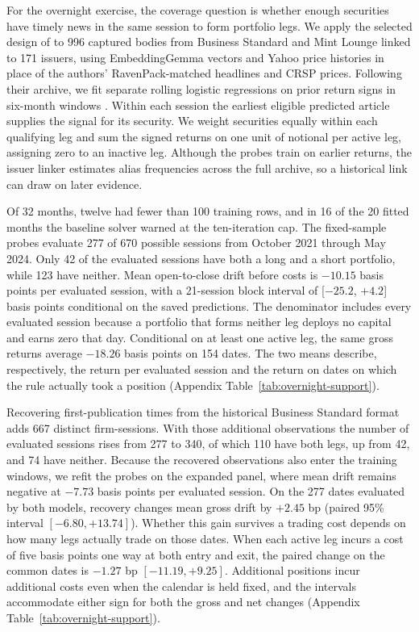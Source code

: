 For the overnight exercise, the coverage question is whether enough
securities have timely news in the same session to form portfolio legs.
We apply the selected design of \citet{lopez2025v6,lopez2026} to 996
captured bodies from Business Standard and Mint Lounge linked to 171
issuers, using EmbeddingGemma vectors and Yahoo price histories in place
of the authors' RavenPack-matched headlines and CRSP prices. Following
their archive, we fit separate rolling logistic regressions on prior
return signs in six-month windows \citep{lopez2026archive}. Within
each session the earliest eligible predicted article supplies
the signal for its security. We weight securities equally within each
qualifying leg and sum the signed returns on one unit of notional per
active leg, assigning zero to an inactive leg. Although the probes
train on earlier returns, the issuer linker estimates alias frequencies
across the full archive, so a historical link can draw on later evidence.

Of 32 months, twelve had fewer than 100 training rows, and in 16 of
the 20 fitted months the baseline solver warned at the ten-iteration
cap. The fixed-sample probes evaluate 277 of 670 possible sessions
from October 2021 through May 2024. Only 42 of the evaluated sessions
have both a long and a short portfolio, while 123 have neither. Mean
open-to-close drift before costs is $-10.15$ basis points per evaluated
session, with a 21-session block interval of [$-25.2$, $+4.2$] basis
points conditional on the saved predictions. The denominator includes
every evaluated session because a portfolio that forms neither leg
deploys no capital and earns zero that day. Conditional on at least
one active leg, the same gross returns average $-18.26$ basis points
on 154 dates. The two means describe, respectively, the return per
evaluated session and the return on dates on which the rule actually
took a position (Appendix Table~\ref{tab:overnight-support}).

Recovering first-publication times from the historical Business Standard
format adds 667 distinct firm-sessions. With those additional
observations the number of evaluated sessions
rises from 277 to 340, of which 110 have both legs, up from 42, and
74 have neither. Because the recovered observations also enter the
training windows, we refit the probes on the expanded panel, where mean
drift remains negative at $-7.73$ basis points per evaluated session.
On the
277 dates evaluated by both models, recovery changes mean gross drift
by $+2.45$ bp (paired 95\% interval $[-6.80,+13.74]$). Whether this
gain survives a trading cost depends on how many legs actually trade
on those dates. When each active leg incurs a cost of five basis points
one way at both entry and exit, the paired change on the common dates is
$-1.27$ bp $[-11.19,+9.25]$. Additional positions incur additional
costs even when the calendar is held fixed, and the intervals accommodate
either sign for both the gross and net changes (Appendix
Table~\ref{tab:overnight-support}).

